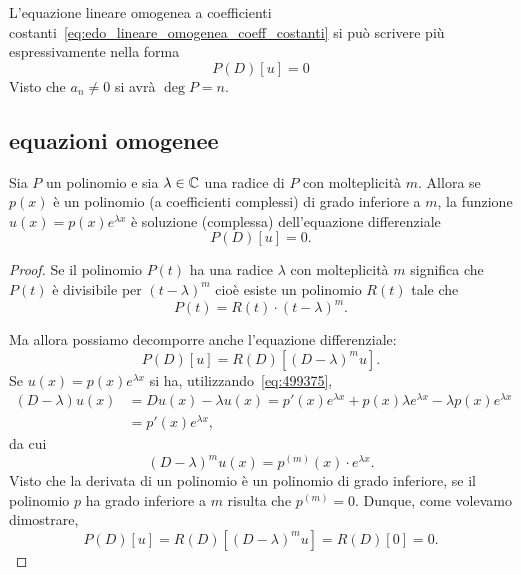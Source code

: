 L'equazione lineare omogenea a coefficienti costanti~\eqref{eq:edo_lineare_omogenea_coeff_costanti}
si può scrivere più espressivamente nella forma
\[
  P(D)[u] = 0
\]
Visto che $a_n\neq 0$ si avrà $\deg P = n$.

\subsection{equazioni omogenee}

\begin{theorem}
\mymark{***}
Sia $P$ un polinomio e sia $\lambda\in {\mathbb C}$ una radice di $P$ con molteplicità $m$.
Allora se $p(x)$ è un polinomio (a coefficienti complessi) di grado inferiore a $m$,
la funzione $u(x) = p(x) e^{\lambda x}$ è soluzione (complessa) dell'equazione differenziale
\[
   P(D) [u] = 0.
\]
\end{theorem}
%
\begin{proof}
\mymark{***}
Se il polinomio $P(t)$ ha una radice $\lambda$ con molteplicità $m$ significa che $P(t)$ è divisibile per $(t-\lambda)^m$ cioè esiste un polinomio $R(t)$ tale che
\[
  P(t) = R(t)\cdot (t-\lambda)^m.
\]

Ma allora possiamo decomporre anche l'equazione differenziale:
\[
 P(D) [u] = R(D)[(D - \lambda)^m u].
\]
Se $u(x) = p(x) e^{\lambda x}$ si ha,
utilizzando~\eqref{eq:499375},
\begin{align*}
  (D-\lambda) u(x) &= Du(x) -\lambda u(x) =
  p'(x) e^{\lambda x} + p(x) \lambda e^{\lambda x} - \lambda p(x) e^{\lambda x} \\
  &= p'(x) e^{\lambda x},
\end{align*}
da cui
\[
  (D-\lambda)^m u(x) = p^{(m)}(x) \cdot e^{\lambda x}.
\]
Visto che la derivata di un polinomio è un polinomio di grado inferiore,
se il polinomio $p$ ha grado inferiore a $m$ risulta che $p^{(m)}=0$.
Dunque, come volevamo dimostrare,
\[
 P(D) [u] = R(D) [(D-\lambda)^m u] = R(D) [0] = 0.
\]
\end{proof}


